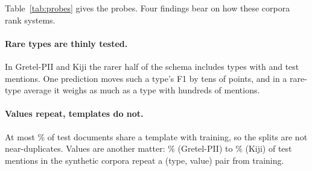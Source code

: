 \documentclass[11pt]{article}
\begin{document}
\begin{table}[t]
\centering
\small
\setlength{\tabcolsep}{3.5pt}
\caption{Probe results on the test split. Rates are upper bounds;
Table~\ref{tab:validation} estimates how many flags are real.
\emph{rare min}: smallest support in the rarer half of the schema;
\emph{value}: test mentions whose (type, value) occurs in training.}
\label{tab:probes}
\end{table}

Table~\ref{tab:probes} gives the probes. Four findings bear on how
these corpora rank systems.

\paragraph{Rare types are thinly tested.}
In Gretel-PII and Kiji the rarer half of the schema includes types with
 and  test mentions. One
prediction moves such a type's F1 by tens of points, and in a rare-type
average it weighs as much as a type with hundreds of mentions.

\paragraph{Values repeat, templates do not.}
At most \% of test documents share a template with
training, so the splits are not near-duplicates. Values are another
matter: \% (Gretel-PII) to \%
(Kiji) of test mentions in the synthetic corpora repeat a (type, value)
pair from training.
\end{document}
